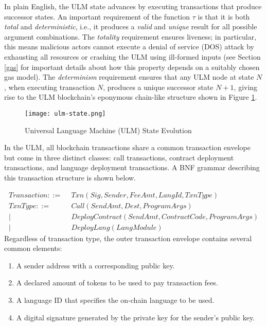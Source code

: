 \documentclass{article}
\newcommand{\ulm}{{ULM}}
\begin{document}
In plain English, the \ulm{} state advances by executing transactions that produce successor states.
An important requirement of the function $\tau$ is that it is both \emph{total} and \emph{deterministic}, i.e., it produces a \emph{valid} and \emph{unique} result for all possible argument combinations.
The \textit{totality} requirement ensures liveness; in particular, this means malicious actors cannot execute a denial of service (DOS) attack by exhausting all resources or crashing the \ulm{} using ill-formed inputs (see Section \ref{gas} for important details about how this property depends on a suitably chosen gas model).
The \textit{determinism} requirement ensures that any \ulm{} node at state $N$, when executing transaction $N$, produces a unique successor state $N+1$, giving rise to the \ulm{} blockchain's eponymous chain-like structure\footnotemark{} shown in Figure \ref{blockchain}.


\begin{figure}
    \centering
    \texttt{[image: ulm-state.png]}
    \caption{Universal Language Machine (ULM) State Evolution}
    \label{blockchain}
\end{figure}

In the \ulm{}, all blockchain transactions share a common transaction envelope but come in three distinct classes: call transactions, contract deployment transactions, and language deployment transactions.
A BNF grammar describing this transaction structure is shown below.


\begin{align*}
Transaction ::=\ \ & Txn(Sig, Sender, FeeAmt, LangId, TxnType)\\
TxnType ::=\ \ & Call(SendAmt, Dest, ProgramArgs)\\
          |\ \ & DeployContract(SendAmt, ContractCode, ProgramArgs)\\
          |\ \ & DeployLang(LangModule)
\end{align*}
\noindent Regardless of transaction type, the outer transaction envelope contains several common elements:

\begin{enumerate}
    \itemsep0.25em
    \item A sender address with a corresponding public key.
    \item A declared amount of tokens to be used to pay transaction fees.
    \item A language ID that specifies the on-chain language to be used.
    \item A digital signature generated by the private key for the sender's public key.
\end{enumerate}
\end{document}
